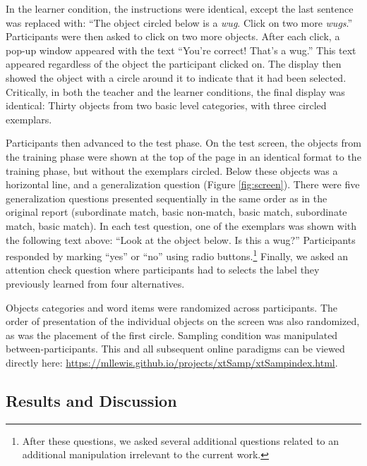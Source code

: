 \documentclass[man]{apa2}
\begin{document}
In the learner condition, the instructions were identical, except the last sentence was replaced with: ``The object circled below is a \textit{wug}. Click on two more \textit{wugs}.'' Participants were then asked to click on two more objects. After each click, a pop-up window appeared with the text ``You're correct! That's a wug.'' This text appeared regardless of the object the participant clicked on. The display then showed the object with a circle around it to indicate that it had been selected. Critically, in both the teacher and the learner conditions, the final display was identical: Thirty objects from two basic level categories, with three circled exemplars.

Participants then advanced to the test phase. On the test screen, the objects from the training phase were shown at the top of the page in an identical format to the training phase, but without the exemplars circled. Below these objects was a horizontal line, and a generalization question (Figure \ref{fig:screen}). There were five generalization questions presented sequentially in the same order as in the original report (subordinate match, basic non-match, basic match, subordinate match, basic match). In each test question, one of the exemplars was shown with the following text above: ``Look at the object below. Is this a wug?'' Participants responded by marking ``yes'' or ``no'' using radio buttons.\footnote{After these questions, we asked several additional questions related to an additional manipulation irrelevant to the current work.} Finally, we asked an attention check question where participants had to selects the label they previously learned from four alternatives.

Objects categories and word items were randomized across participants. The order of presentation of the individual objects on the screen was also randomized, as was the placement of the first circle. Sampling condition was manipulated between-participants. This and all subsequent online paradigms can be viewed directly here: \url{https://mllewis.github.io/projects/xtSamp/xtSampindex.html}.

\subsection{Results and Discussion}
\end{document}
